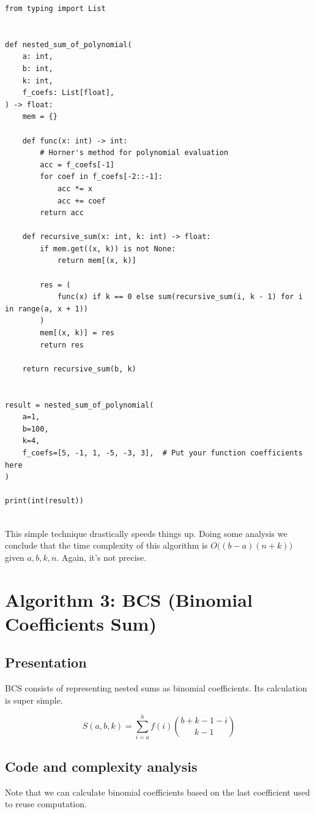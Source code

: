 \documentclass[12pt]{article}
\begin{document}
\begin{lstlisting}[style=Python]
from typing import List


def nested_sum_of_polynomial(
    a: int,
    b: int,
    k: int,
    f_coefs: List[float],
) -> float:
    mem = {}

    def func(x: int) -> int:
        # Horner's method for polynomial evaluation
        acc = f_coefs[-1]
        for coef in f_coefs[-2::-1]:
            acc *= x
            acc += coef
        return acc

    def recursive_sum(x: int, k: int) -> float:
        if mem.get((x, k)) is not None:
            return mem[(x, k)]

        res = (
            func(x) if k == 0 else sum(recursive_sum(i, k - 1) for i in range(a, x + 1))
        )
        mem[(x, k)] = res
        return res

    return recursive_sum(b, k)


result = nested_sum_of_polynomial(
    a=1,
    b=100,
    k=4,
    f_coefs=[5, -1, 1, -5, -3, 3],  # Put your function coefficients here
)

print(int(result))
    
\end{lstlisting}

This simple technique drastically speeds things up. Doing some analysis we conclude that the time complexity of this algorithm is $O\Big((b - a)(n + k)\Big)$ given $a, b, k, n$. Again, it's not precise.

\section{Algorithm 3: BCS (Binomial Coefficients Sum)}

\subsection{Presentation}

BCS consists of representing nested sums as binomial coefficients. Its calculation is super simple.

$$
    S(a, b, k) = \sum_{i=a}^{b} f(i) \binom{b + k - 1 - i}{k - 1}
$$

\subsection{Code and complexity analysis}

Note that we can calculate binomial coefficients based on the last coefficient used to reuse computation.
\end{document}
